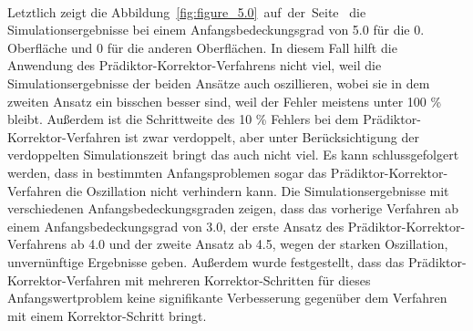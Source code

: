 \documentclass{listhesis}
\begin{document}
\paragraph{}
Letztlich zeigt die Abbildung~\ref{fig:figure_5.0}~auf~der~Seite~\pageref{fig:figure_5.0} die Simulationsergebnisse bei einem Anfangsbedeckungsgrad von 5.0 für die 0. Oberfläche und 0 für die anderen Oberflächen. In diesem Fall hilft die Anwendung des Prädiktor-Korrektor-Verfahrens nicht viel, weil die Simulationsergebnisse der beiden Ansätze auch oszillieren, wobei sie in dem zweiten Ansatz ein bisschen besser sind, weil der Fehler meistens unter 100 \% bleibt. Außerdem ist die Schrittweite des 10 \% Fehlers bei dem Prädiktor-Korrektor-Verfahren ist zwar verdoppelt, aber unter Berücksichtigung der verdoppelten Simulationszeit bringt das auch nicht viel. Es kann schlussgefolgert werden, dass in bestimmten Anfangsproblemen sogar das Prädiktor-Korrektor-Verfahren die Oszillation nicht verhindern kann. Die Simulationsergebnisse mit verschiedenen Anfangsbedeckungsgraden zeigen, dass das vorherige Verfahren ab einem Anfangsbedeckungsgrad von 3.0, der erste Ansatz des Prädiktor-Korrektor-Verfahrens ab 4.0 und der zweite Ansatz ab 4.5, wegen der starken Oszillation, unvernünftige Ergebnisse geben. Außerdem wurde festgestellt, dass das Prädiktor-Korrektor-Verfahren mit mehreren Korrektor-Schritten für dieses Anfangswertproblem keine signifikante Verbesserung gegenüber dem Verfahren mit einem Korrektor-Schritt bringt.


\clearpage
\end{document}
